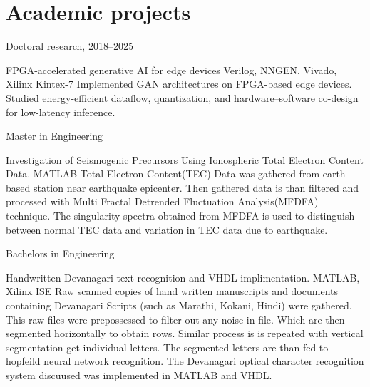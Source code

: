 \documentclass[fontsize=11pt]{tccv}
\begin{document}
\section{Academic projects}

\begin{fromto}
	\item{Doctoral research, 2018--2025}
\end{fromto}
\begin{project}
	\item{FPGA-accelerated generative AI for edge devices}
	{Verilog, NNGEN, Vivado, Xilinx Kintex-7}
	{Implemented GAN architectures on FPGA-based edge devices. Studied energy-efficient dataflow, quantization, and hardware--software co-design for low-latency inference.}\\
\end{project}
\vspace{1em}

\begin{fromto}
	\item{Master in Engineering}
\end{fromto}
\begin{project}
	\item{Investigation of Seismogenic Precursors Using Ionospheric Total Electron Content Data.}
	{MATLAB}
	{Total Electron Content(TEC) Data was gathered from earth based station near earthquake epicenter. Then gathered data is than filtered and processed with Multi Fractal Detrended Fluctuation Analysis(MFDFA) technique. The singularity spectra obtained from MFDFA is used to distinguish between normal TEC data and variation in TEC data due to earthquake.}\\
\end{project}
\vspace{1em}

\vspace{1em}
\begin{fromto}
	\item{Bachelors in Engineering}
\end{fromto}
\begin{project}
	\item{ Handwritten Devanagari text recognition and VHDL implimentation.}
	{MATLAB, Xilinx ISE}
	{Raw scanned copies of hand written manuscripts and documents containing Devanagari Scripts (such as Marathi, Kokani, Hindi) were gathered. This raw files were prepossessed to filter out any noise in file. Which are then segmented horizontally to obtain rows. Similar process is is repeated with vertical segmentation get individual letters. The segmented letters are than fed to hopfeild neural network recognition. The Devanagari optical character recognition system discuused was  implemented in MATLAB and VHDL.}\\
\end{project}	
\vspace{1em}
\end{document}
